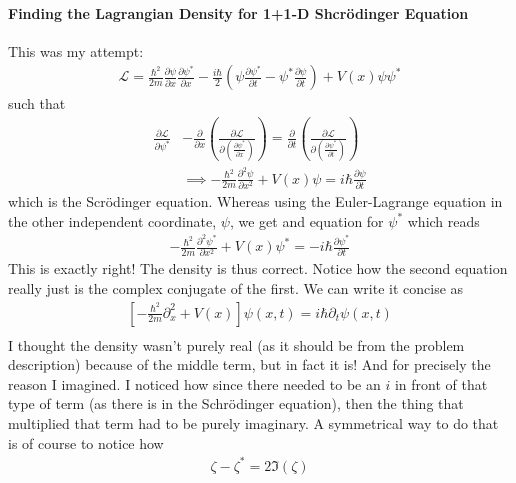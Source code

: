 \paragraph{Finding the Lagrangian Density for 1+1-D Shcrödinger Equation}
This was my attempt: \begin{align*}
    \mathcal{L} = \frac{\hbar^{2} }{2m}\frac{\partial \psi }{\partial x}\frac{\partial \psi^{\ast}}{\partial x}  - \frac{i\hbar}{2}\left( \psi \frac{\partial \psi ^{\ast} }{\partial t}  - \psi ^{\ast} \frac{\partial \psi }{\partial t} \right) + V(x) \psi \psi ^{\ast} 
\end{align*}
such that \begin{align*}
    \frac{\partial \mathcal{L} }{\partial \psi^{\ast} } &- \frac{\partial}{\partial x}  \left( \frac{\partial \mathcal{L} }{\partial \left( \frac{\partial \psi ^{\ast} }{\partial x}  \right) }  \right) = \frac{\partial }{\partial t} \left( \frac{\partial \mathcal{L} }{\partial \left( \frac{\partial \psi ^{\ast} }{\partial t}  \right) }  \right) \\
    &\implies -\frac{\hbar^{2} }{2m} \frac{\partial^{2}  \psi}{\partial x^{2} } + V(x) \psi = i \hbar \frac{\partial \psi }{\partial t}   
\end{align*}
which is the Scrödinger equation. Whereas using the Euler-Lagrange equation in the other independent coordinate, \(\psi\), we get and equation for \(\psi ^{\ast} \) which reads \begin{align*}
    -\frac{\hbar^{2} }{2m} \frac{\partial^{2}  \psi^{\ast} }{\partial x^{2} } + V(x) \psi^{\ast}  = -i \hbar \frac{\partial \psi^{\ast}  }{\partial t} 
\end{align*} 
This is exactly right! The density is thus correct. Notice how the second equation really just is the complex conjugate of the first. We can write it concise as \begin{align*}
    \left[ -\frac{\hbar^{2} }{2m}\partial_x ^{2} + V(x) \right]\psi (x, t) = i \hbar \partial _t \psi(x, t) \tag{1}\\
\end{align*}
I thought the density wasn't purely real (as it should be from the problem description) because of the middle term, but in fact it is! And for precisely the reason I imagined. I noticed how since there needed to be an \(i\) in front of that type of term (as there is in the Schrödinger equation), then the thing that multiplied that term had to be purely imaginary. A symmetrical way to do that is of course to notice how \begin{align*}
    \zeta - \zeta ^{\ast} = 2 \Im(\zeta)
\end{align*}
